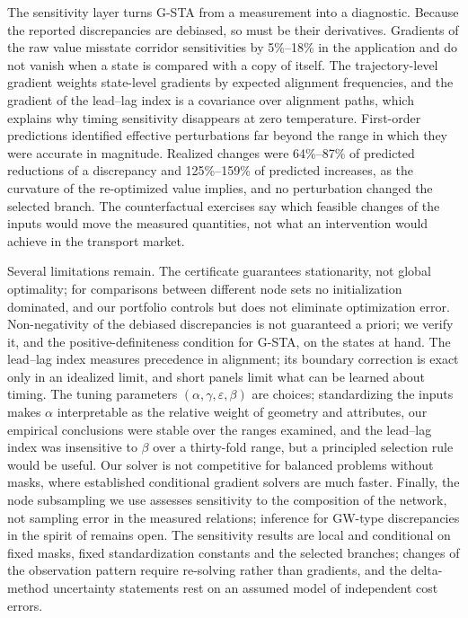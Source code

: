 \documentclass[12pt]{article}
\theoremstyle{definition}
\begin{document}
The sensitivity layer turns G-STA from a measurement into a diagnostic. Because the reported discrepancies are debiased, so must be their derivatives. Gradients of the raw value misstate corridor sensitivities by 5\%--18\% in the application and do not vanish when a state is compared with a copy of itself. The trajectory-level gradient weights state-level gradients by expected alignment frequencies, and the gradient of the lead--lag index is a covariance over alignment paths, which explains why timing sensitivity disappears at zero temperature. First-order predictions identified effective perturbations far beyond the range in which they were accurate in magnitude. Realized changes were 64\%--87\% of predicted reductions of a discrepancy and 125\%--159\% of predicted increases, as the curvature of the re-optimized value implies, and no perturbation changed the selected branch. The counterfactual exercises say which feasible changes of the inputs would move the measured quantities, not what an intervention would achieve in the transport market.

Several limitations remain. The certificate guarantees stationarity, not global optimality; for comparisons between different node sets no initialization dominated, and our portfolio controls but does not eliminate optimization error. Non-negativity of the debiased discrepancies is not guaranteed a priori; we verify it, and the positive-definiteness condition for G-STA, on the states at hand. The lead--lag index measures precedence in alignment; its boundary correction is exact only in an idealized limit, and short panels limit what can be learned about timing. The tuning parameters $(\alpha,\gamma,\varepsilon,\beta)$ are choices; standardizing the inputs makes $\alpha$ interpretable as the relative weight of geometry and attributes, our empirical conclusions were stable over the ranges examined, and the lead--lag index was insensitive to $\beta$ over a thirty-fold range, but a principled selection rule would be useful. Our solver is not competitive for balanced problems without masks, where established conditional gradient solvers are much faster. Finally, the node subsampling we use assesses sensitivity to the composition of the network, not sampling error in the measured relations; inference for GW-type discrepancies in the spirit of \citet{sommerfeld2018inference} remains open. The sensitivity results are local and conditional on fixed masks, fixed standardization constants and the selected branches; changes of the observation pattern require re-solving rather than gradients, and the delta-method uncertainty statements rest on an assumed model of independent cost errors.
\end{document}
